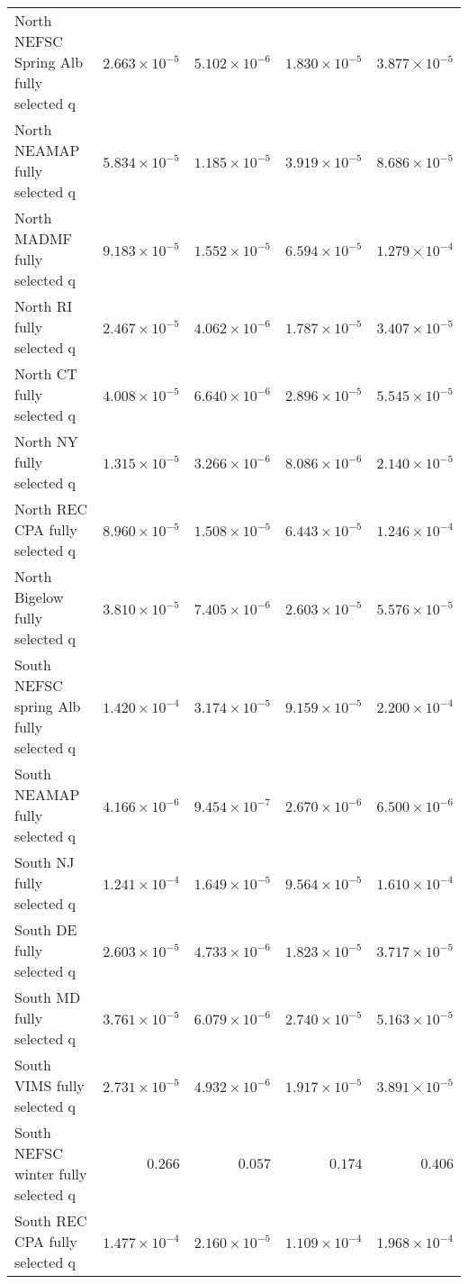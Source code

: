 \documentclass[
]{article}
\begin{document}
\begin{landscape}
\begin{longtable}[t]{lrrrr}
\addlinespace
North NEFSC Spring Alb fully selected q & $2.663\times 10^{-5}$ & $5.102\times 10^{-6}$ & $1.830\times 10^{-5}$ & $3.877\times 10^{-5}$\\
North NEAMAP fully selected q & $5.834\times 10^{-5}$ & $1.185\times 10^{-5}$ & $3.919\times 10^{-5}$ & $8.686\times 10^{-5}$\\
North MADMF fully selected q & $9.183\times 10^{-5}$ & $1.552\times 10^{-5}$ & $6.594\times 10^{-5}$ & $1.279\times 10^{-4}$\\
North RI fully selected q & $2.467\times 10^{-5}$ & $4.062\times 10^{-6}$ & $1.787\times 10^{-5}$ & $3.407\times 10^{-5}$\\
North CT fully selected q & $4.008\times 10^{-5}$ & $6.640\times 10^{-6}$ & $2.896\times 10^{-5}$ & $5.545\times 10^{-5}$\\
\addlinespace
North NY fully selected q & $1.315\times 10^{-5}$ & $3.266\times 10^{-6}$ & $8.086\times 10^{-6}$ & $2.140\times 10^{-5}$\\
North REC CPA fully selected q & $8.960\times 10^{-5}$ & $1.508\times 10^{-5}$ & $6.443\times 10^{-5}$ & $1.246\times 10^{-4}$\\
North Bigelow fully selected q & $3.810\times 10^{-5}$ & $7.405\times 10^{-6}$ & $2.603\times 10^{-5}$ & $5.576\times 10^{-5}$\\
South NEFSC spring Alb fully selected q & $1.420\times 10^{-4}$ & $3.174\times 10^{-5}$ & $9.159\times 10^{-5}$ & $2.200\times 10^{-4}$\\
South NEAMAP fully selected q & $4.166\times 10^{-6}$ & $9.454\times 10^{-7}$ & $2.670\times 10^{-6}$ & $6.500\times 10^{-6}$\\
\addlinespace
South NJ fully selected q & $1.241\times 10^{-4}$ & $1.649\times 10^{-5}$ & $9.564\times 10^{-5}$ & $1.610\times 10^{-4}$\\
South DE fully selected q & $2.603\times 10^{-5}$ & $4.733\times 10^{-6}$ & $1.823\times 10^{-5}$ & $3.717\times 10^{-5}$\\
South MD fully selected q & $3.761\times 10^{-5}$ & $6.079\times 10^{-6}$ & $2.740\times 10^{-5}$ & $5.163\times 10^{-5}$\\
South VIMS fully selected q & $2.731\times 10^{-5}$ & $4.932\times 10^{-6}$ & $1.917\times 10^{-5}$ & $3.891\times 10^{-5}$\\
South NEFSC winter fully selected q & $0.266$ & $0.057$ & $0.174$ & $0.406$\\
\addlinespace
South REC CPA fully selected q & $1.477\times 10^{-4}$ & $2.160\times 10^{-5}$ & $1.109\times 10^{-4}$ & $1.968\times 10^{-4}$\\

\end{longtable}
\end{landscape}
\end{document}
